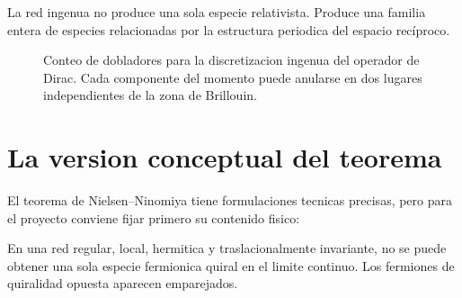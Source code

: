 La red ingenua no produce una sola especie relativista. Produce una familia entera de especies relacionadas por la estructura periodica del espacio recíproco.

\begin{figure}[ht]
\centering
{}
\caption{Conteo de dobladores para la discretizacion ingenua del operador de Dirac. Cada componente del momento puede anularse en dos lugares independientes de la zona de Brillouin.}
\label{c26:fig:2d-power}
\end{figure}

\section{La version conceptual del teorema}

El teorema de Nielsen--Ninomiya tiene formulaciones tecnicas precisas, pero para el proyecto conviene fijar primero su contenido fisico:

\begin{displayquote}
En una red regular, local, hermitica y traslacionalmente invariante, no se puede obtener una sola especie fermionica quiral en el limite continuo. Los fermiones de quiralidad opuesta aparecen emparejados.
\end{displayquote}

